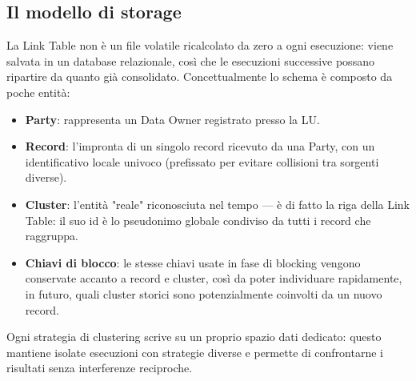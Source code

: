 \documentclass[11pt,a4paper]{article}
\begin{document}
\subsection{Il modello di storage}

La Link Table non \`e un file volatile ricalcolato da zero a ogni esecuzione:
viene salvata in un database relazionale, cos\`i che le esecuzioni successive
possano ripartire da quanto gi\`a consolidato. Concettualmente lo schema \`e
composto da poche entit\`a:

\begin{itemize}[nosep]
    \item \textbf{Party}: rappresenta un Data Owner registrato presso la LU.
    \item \textbf{Record}: l'impronta di un singolo record ricevuto da una
        Party, con un identificativo locale univoco (prefissato per evitare
        collisioni tra sorgenti diverse).
    \item \textbf{Cluster}: l'entit\`a "reale" riconosciuta nel tempo --- \`e
        di fatto la riga della Link Table: il suo id \`e lo pseudonimo globale
        condiviso da tutti i record che raggruppa.
    \item \textbf{Chiavi di blocco}: le stesse chiavi usate in fase di
        blocking vengono conservate accanto a record e cluster, cos\`i da
        poter individuare rapidamente, in futuro, quali cluster storici sono
        potenzialmente coinvolti da un nuovo record.
\end{itemize}

Ogni strategia di clustering scrive su un proprio spazio dati dedicato: questo
mantiene isolate esecuzioni con strategie diverse e permette di confrontarne
i risultati senza interferenze reciproche.
\end{document}
